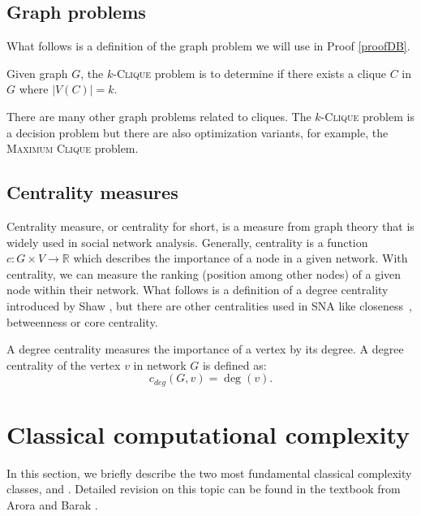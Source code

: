 \subsection{Graph problems}

What follows is a definition of the \NPh graph problem we will use in Proof \ref{proofDB}.

\begin{definition}
    Given graph $G$, the $k$-\textsc{Clique} problem is to determine if
    there exists a clique $C$ in $G$ where $|V(C)| = k$.
\end{definition}

There are many other graph problems related to cliques. The $k$-\textsc{Clique} problem is a decision problem but
there are also optimization variants, for example, the \textsc{Maximum Clique} problem.


\subsection{Centrality measures}

Centrality measure, or centrality for short, is a measure from graph theory that is widely used in social network analysis.
Generally, centrality is a function $c: G \times V \rightarrow \mathbb{R}$ which describes the importance of a node in a given network.
With centrality, we can measure the ranking (position among other nodes) of a given node within their network.
What follows is a definition of a degree centrality introduced by Shaw \cite{Shaw1954}, but there are other centralities used in SNA like
closeness~\cite{Beauchamp1965}, betweenness \cite{Anthonisse1971,Freeman1977} or core \cite{Seidman1983} centrality.

\begin{definition}
    A degree centrality measures the importance of a vertex by its degree.
    A degree centrality of the vertex $v$ in network $G$ is defined as:
    $$c_{deg}(G, v) = \deg(v).$$
\end{definition}


\section{Classical computational complexity}

In this section, we briefly describe the two most fundamental classical complexity classes, \Po and \NP.
Detailed revision on this topic can be found in the textbook from Arora and Barak \cite{Arora2009}.

